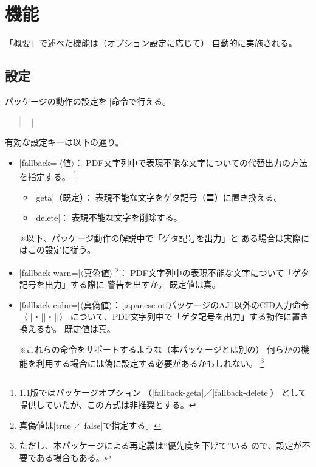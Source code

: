 \documentclass[uplatex,dvipdfmx,a4paper]{jsarticle}
\renewcommand{\headfont}{\gtfamily\romanseries{sbc}\sffamily}
\newcommand{\Pkg}[1]{\textsf{#1}}
\newcommand{\Meta}[1]{$\langle$\mbox{}#1\mbox{}$\rangle$}
\newcommand{\Note}{\par\noindent ※}
\newcommand{\Means}{：\quad}
\providecommand{\Strong}[1]{{\headfont#1}}
\begin{document}
\section{機能}

「概要」で述べた機能は（オプション設定に応じて）
自動的に実施される。

\subsection{設定}
\label{ssec:setup}

パッケージの動作の設定を|\pxjahypersetup|命令で行える。

\begin{quote}\small
|\pxjahypersetup{|\Meta{キー}|=|\Meta{値}|,...}|
\end{quote}

有効な設定キーは以下の通り。

\begin{itemize}
\item |fallback=|\Meta{値}\Means
  PDF文字列中で表現不能な文字についての代替出力の方法を指定する。
  \footnote{1.1版ではパッケージオプション
    （|fallback-geta|／|fallback-delete|）
    として提供していたが、この方式は\Strong{非推奨}とする。}
  \begin{itemize}
  \item |geta|（既定）\Means
    表現不能な文字をゲタ記号（〓）に置き換える。
  \item |delete|\Means
    表現不能な文字を削除する。
  \end{itemize}
  \Note 以下、パッケージ動作の解説中で「ゲタ記号を出力」と
    ある場合は実際にはこの設定に従う。
\item |fallback-warn=|\Meta{真偽値}%
  \footnote{真偽値は|true|／|false|で指定する。}\Means
  PDF文字列中の表現不能な文字について「ゲタ記号を出力」する際に
  警告を出すか。
  既定値は真。
\item |fallback-cidm=|\Meta{真偽値}\Means
  \Pkg{japanese-otf}パッケージのAJ1\Strong{以外}のCID入力命令
  （|\CIDC|・|\CIDK|・|\CIDT|）
  について、PDF文字列中で「ゲタ記号を出力」する動作に置き換えるか。
  既定値は真。
  \Note これらの命令をサポートするような（本パッケージとは別の）
  何らかの機能を利用する場合には偽に設定する必要があるかもしれない。
  \footnote{ただし、本パッケージによる再定義は“優先度を下げて”いる
    ので、設定が不要である場合もある。}
\end{itemize}
\end{document}
